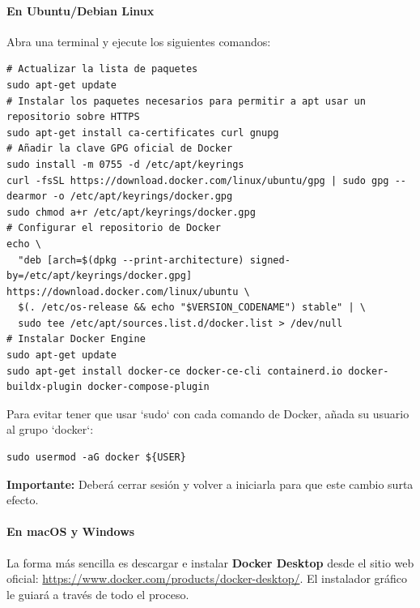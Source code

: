 \paragraph{En Ubuntu/Debian Linux}
Abra una terminal y ejecute los siguientes comandos:
\begin{verbatim}
# Actualizar la lista de paquetes
sudo apt-get update
# Instalar los paquetes necesarios para permitir a apt usar un repositorio sobre HTTPS
sudo apt-get install ca-certificates curl gnupg
# Añadir la clave GPG oficial de Docker
sudo install -m 0755 -d /etc/apt/keyrings
curl -fsSL https://download.docker.com/linux/ubuntu/gpg | sudo gpg --dearmor -o /etc/apt/keyrings/docker.gpg
sudo chmod a+r /etc/apt/keyrings/docker.gpg
# Configurar el repositorio de Docker
echo \
  "deb [arch=$(dpkg --print-architecture) signed-by=/etc/apt/keyrings/docker.gpg] https://download.docker.com/linux/ubuntu \
  $(. /etc/os-release && echo "$VERSION_CODENAME") stable" | \
  sudo tee /etc/apt/sources.list.d/docker.list > /dev/null
# Instalar Docker Engine
sudo apt-get update
sudo apt-get install docker-ce docker-ce-cli containerd.io docker-buildx-plugin docker-compose-plugin
\end{verbatim}
Para evitar tener que usar `sudo` con cada comando de Docker, añada su usuario al grupo `docker`:
\begin{verbatim}
sudo usermod -aG docker ${USER}
\end{verbatim}
\textbf{Importante:} Deberá cerrar sesión y volver a iniciarla para que este cambio surta efecto.

\paragraph{En macOS y Windows}
La forma más sencilla es descargar e instalar \textbf{Docker Desktop} desde el sitio web oficial: \url{https://www.docker.com/products/docker-desktop/}. El instalador gráfico le guiará a través de todo el proceso.

